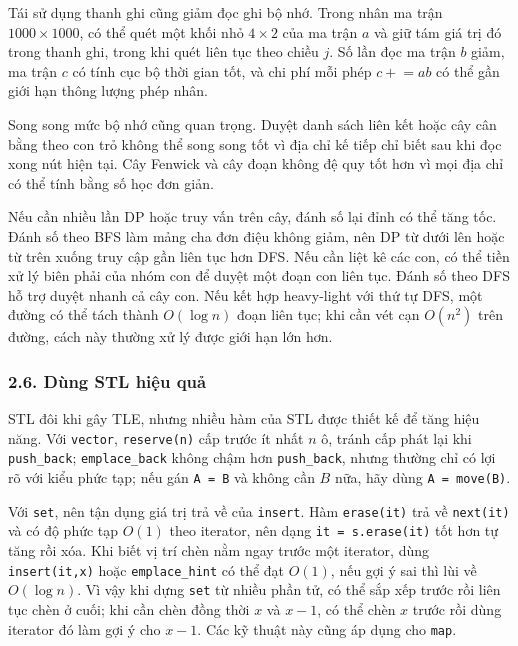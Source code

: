 \documentclass[11pt]{article}
\begin{document}
Tái sử dụng thanh ghi cũng giảm đọc ghi bộ nhớ. Trong nhân ma trận \(1000\times
1000\), có thể quét một khối nhỏ \(4\times2\) của ma trận \(a\) và giữ tám giá
trị đó trong thanh ghi, trong khi quét liên tục theo chiều \(j\). Số lần đọc
ma trận \(b\) giảm, ma trận \(c\) có tính cục bộ thời gian tốt, và chi phí mỗi
phép \(c\mathrel{+}=a b\) có thể gần giới hạn thông lượng phép nhân.

Song song mức bộ nhớ cũng quan trọng. Duyệt danh sách liên kết hoặc cây cân
bằng theo con trỏ không thể song song tốt vì địa chỉ kế tiếp chỉ biết sau khi
đọc xong nút hiện tại. Cây Fenwick và cây đoạn không đệ quy tốt hơn vì mọi địa
chỉ có thể tính bằng số học đơn giản.

Nếu cần nhiều lần DP hoặc truy vấn trên cây, đánh số lại đỉnh có thể tăng tốc.
Đánh số theo BFS làm mảng cha đơn điệu không giảm, nên DP từ dưới lên hoặc từ
trên xuống truy cập gần liên tục hơn DFS. Nếu cần liệt kê các con, có thể tiền
xử lý biên phải của nhóm con để duyệt một đoạn con liên tục. Đánh số theo DFS
hỗ trợ duyệt nhanh cả cây con. Nếu kết hợp heavy-light với thứ tự DFS, một
đường có thể tách thành \(O(\log n)\) đoạn liên tục; khi cần vét cạn \(O(n^2)\)
trên đường, cách này thường xử lý được giới hạn lớn hơn.

\subsubsection*{2.6. Dùng STL hiệu quả}

STL đôi khi gây TLE, nhưng nhiều hàm của STL được thiết kế để tăng hiệu năng.
Với \texttt{vector}, \texttt{reserve(n)} cấp trước ít nhất \(n\) ô, tránh cấp
phát lại khi \texttt{push\_back}; \texttt{emplace\_back} không chậm hơn
\texttt{push\_back}, nhưng thường chỉ có lợi rõ với kiểu phức tạp; nếu gán
\texttt{A = B} và không cần \(B\) nữa, hãy dùng \texttt{A = move(B)}.

Với \texttt{set}, nên tận dụng giá trị trả về của \texttt{insert}. Hàm
\texttt{erase(it)} trả về \texttt{next(it)} và có độ phức tạp \(O(1)\) theo
iterator, nên dạng \texttt{it = s.erase(it)} tốt hơn tự tăng rồi xóa. Khi biết
vị trí chèn nằm ngay trước một iterator, dùng \texttt{insert(it,x)} hoặc
\texttt{emplace\_hint} có thể đạt \(O(1)\), nếu gợi ý sai thì lùi về
\(O(\log n)\). Vì vậy khi dựng \texttt{set} từ nhiều phần tử, có thể sắp xếp
trước rồi liên tục chèn ở cuối; khi cần chèn đồng thời \(x\) và \(x-1\), có thể
chèn \(x\) trước rồi dùng iterator đó làm gợi ý cho \(x-1\). Các kỹ thuật này
cũng áp dụng cho \texttt{map}.
\end{document}
